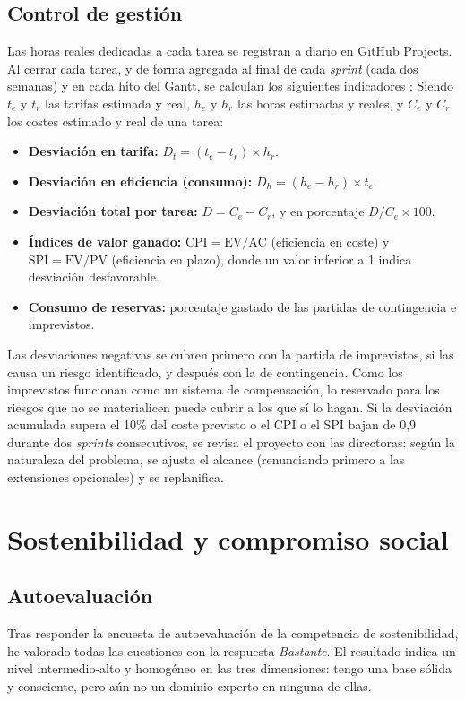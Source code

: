 \documentclass[12pt, a4paper, oneside]{report}
\begin{document}
\section{Control de gestión}
\label{sec:control}
Las horas reales dedicadas a cada tarea se registran a diario en GitHub Projects. Al cerrar cada tarea, y de forma agregada al final de cada \textit{sprint} (cada dos semanas) y en cada hito del Gantt, se calculan los siguientes indicadores \cite{fib_costos, pmi2021pmbok}:
Siendo $t_e$ y $t_r$ las tarifas estimada y real, $h_e$ y $h_r$ las horas estimadas y reales, y $C_e$ y $C_r$ los costes estimado y real de una tarea:
\begin{itemize}
    \item \textbf{Desviación en tarifa:} $D_t = (t_e - t_r) \times h_r$.
    \item \textbf{Desviación en eficiencia (consumo):} $D_h = (h_e - h_r) \times t_e$.
    \item \textbf{Desviación total por tarea:} $D = C_e - C_r$, y en porcentaje $D/C_e \times 100$.
    \item \textbf{Índices de valor ganado:} $\text{CPI} = \text{EV}/\text{AC}$ (eficiencia en coste) y $\text{SPI} = \text{EV}/\text{PV}$ (eficiencia en plazo), donde un valor inferior a 1 indica desviación desfavorable.
    \item \textbf{Consumo de reservas:} porcentaje gastado de las partidas de contingencia e imprevistos.
\end{itemize}

Las desviaciones negativas se cubren primero con la partida de imprevistos, si las causa un riesgo identificado, y después con la de contingencia. Como los imprevistos funcionan como un sistema de compensación, lo reservado para los riesgos que no se materialicen puede cubrir a los que sí lo hagan. Si la desviación acumulada supera el 10\% del coste previsto o el CPI o el SPI bajan de 0,9 durante dos \textit{sprints} consecutivos, se revisa el proyecto con las directoras: según la naturaleza del problema, se ajusta el alcance (renunciando primero a las extensiones opcionales) y se replanifica.

\chapter{Sostenibilidad y compromiso social}

\section{Autoevaluación}
Tras responder la encuesta de autoevaluación de la competencia de sostenibilidad, he valorado todas las cuestiones con la respuesta \textit{\guillemotleft{}Bastante\guillemotright{}}. El resultado indica un nivel intermedio-alto y homogéneo en las tres dimensiones: tengo una base sólida y consciente, pero aún no un dominio experto en ninguna de ellas.
\end{document}
